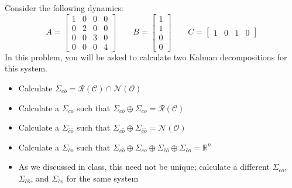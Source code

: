 \documentclass[11pt]{report}
\newcommand{\mc}{\mathcal}
\newcommand{\mb}{\mathbb}
\begin{document}
Consider the following dynamics:
\[
A =
\begin{bmatrix}
1 & 0 & 0 & 0 \\
0 & 2 & 0 & 0 \\
0 & 0 & 3 & 0 \\
0 & 0 & 0 & 4
\end{bmatrix}
\qquad
B =
\begin{bmatrix}
1 \\ 1 \\ 0 \\ 0
\end{bmatrix}
\qquad
C =
\begin{bmatrix}
1 & 0 & 1 & 0
\end{bmatrix}
\]
In this problem, you will be asked to calculate two Kalman decompositions for this system.
\begin{itemize}
\item Calculate $\Sigma_{c \bar o} = \mc{R}(\mc{C}) \cap \mc{N}(\mc{O})$
\item Calculate a $\Sigma_{c o}$ such that $\Sigma_{c \bar o} \oplus \Sigma_{c o} = \mc{R}(\mc{C})$
\item Calculate a $\Sigma_{\bar c \bar o}$ such that $\Sigma_{c \bar o} \oplus \Sigma_{\bar c \bar o} = \mc{N}(\mc{O})$
\item Calculate a $\Sigma_{\bar c o}$ such that $\Sigma_{c \bar o} \oplus \Sigma_{c o} \oplus \Sigma_{\bar c \bar o} \oplus \Sigma_{\bar c o} = \mb{R}^n$
\item As we discussed in class, this need not be unique; calculate a different $\Sigma_{c o}$, $\Sigma_{\bar c \bar o}$, and $\Sigma_{\bar c o}$ for the same system
\end{itemize}

\end{document}

